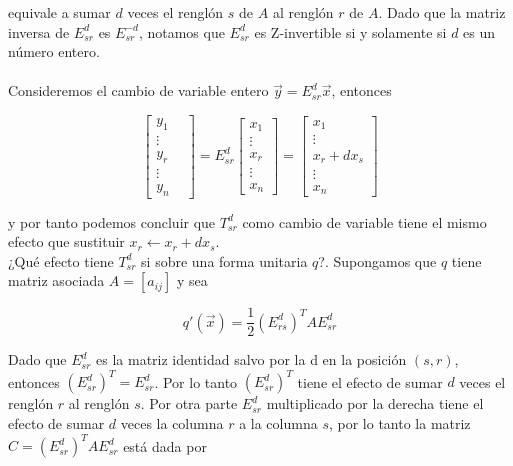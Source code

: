 equivale a sumar $d$ veces el renglón $s$ de $A$ al renglón $r$ de $A$. Dado que la matriz inversa de $E_{sr}^{d}$ es $E_{sr}^{-d}$, notamos que $E_{sr}^{d}$ es $\mathrm{Z}$-invertible si y solamente si $d$ es un número entero.

\paragraph{}
Consideremos el cambio de variable entero $\overrightarrow{y} = E_{sr}^{d}\overrightarrow{x}$, entonces

\begin{equation*}
    \begin{bmatrix}
    y_{1}\\
    \vdots\\
    y_{r}\\
    \vdots\\
    y_{n}&
    \end{bmatrix} = E_{sr}^{d}\begin{bmatrix}
    x_{1}\\
    \vdots\\
    x_{r}\\
    \vdots\\
    x_{n}
    \end{bmatrix} = \begin{bmatrix}
     x_{1}\\
    \vdots\\
    x_{r} + dx_{s}\\
    \vdots\\
    x_{n}
    \end{bmatrix}
\end{equation*}

y por tanto podemos concluir que $T_{sr}^{d}$ como cambio de variable tiene el mismo efecto que sustituir $x_{r} \leftarrow x_{r} + dx_{s}$.\\ ¿Qué efecto tiene $T_{sr}^{d}$ si sobre una forma unitaria $q$?. Supongamos que $q$ tiene matriz asociada $A = \left[a_{ij}\right]$ y sea

\begin{equation*}
    q'(\overrightarrow{x}) = \frac{1}{2}\left(E_{rs}^{d}\right)^{T} A E_{sr}^{d}
\end{equation*}

Dado que $E_{sr}^{d}$ es la matriz identidad salvo por la d en la posición $(s, r)$, entonces $\left(E_{sr}^{d}\right)^{T} = E_{sr}^{d}$. Por lo tanto $\left(E_{sr}^{d}\right)^{T}$ tiene el efecto de sumar $d$ veces el renglón $r$ al renglón $s$. Por otra parte $E_{sr}^{d}$ multiplicado por la derecha tiene el efecto de sumar $d$ veces la columna $r$ a la columna $s$, por lo tanto la matriz $C = \left(E_{sr}^{d}\right)^{T} A E_{sr}^{d}$ está dada por

